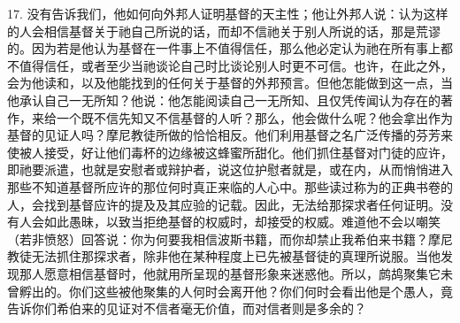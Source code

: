 17. 没有告诉我们，他如何向外邦人证明基督的天主性；他让外邦人说：认为这样的人会相信基督关于祂自己所说的话，而却不信祂关于别人所说的话，那是荒谬的。因为若是他认为基督在一件事上不值得信任，那么他必定认为祂在所有事上都不值得信任，或者至少当祂谈论自己时比谈论别人时更不可信。也许，在此之外，会为他读和，以及他能找到的任何关于基督的外邦预言。但他怎能做到这一点，当他承认自己一无所知？他说：他怎能阅读自己一无所知、且仅凭传闻认为存在的著作，来给一个既不信先知又不信基督的人听？那么，他会做什么呢？他会拿出作为基督的见证人吗？摩尼教徒所做的恰恰相反。他们利用基督之名广泛传播的芬芳来使被人接受，好让他们毒杯的边缘被这蜂蜜所甜化。他们抓住基督对门徒的应许，即祂要派遣，也就是安慰者或辩护者，说这位护慰者就是，或在内，从而悄悄进入那些不知道基督所应许的那位何时真正来临的人心中。那些读过称为的正典书卷的人，会找到基督应许的提及及其应验的记载。因此，无法给那探求者任何证明。没有人会如此愚昧，以致当拒绝基督的权威时，却接受的权威。难道他不会以嘲笑（若非愤怒）回答说：你为何要我相信波斯书籍，而你却禁止我希伯来书籍？摩尼教徒无法抓住那探求者，除非他在某种程度上已先被基督徒的真理所说服。当他发现那人愿意相信基督时，他就用所呈现的基督形象来迷惑他。所以，鹧鸪聚集它未曾孵出的。你们这些被他聚集的人何时会离开他？你们何时会看出他是个愚人，竟告诉你们希伯来的见证对不信者毫无价值，而对信者则是多余的？\par

